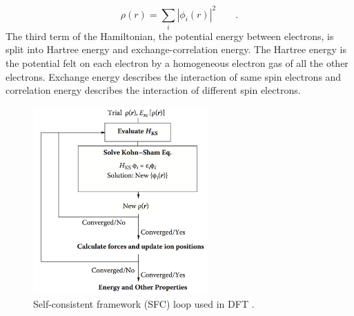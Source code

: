 \documentclass[3p,review,12pt]{elsarticle}
\begin{document}
\begin{equation}
\rho (r) = \sum_{i}|\phi _{i}(r)|^{2} \qquad.
\end{equation}
The third term of the Hamiltonian, the potential energy between electrons, is split into Hartree energy and exchange-correlation energy. The Hartree energy is  the potential felt on each electron by a homogeneous electron gas of all the other electrons. Exchange energy describes the interaction of same spin electrons and correlation energy describes the interaction of different spin electrons.
\begin{figure}[h]
	\includegraphics[width=0.6\textwidth]{scf}
	\centering
	\caption{Self-consistent framework (SFC) loop used in DFT \cite{Lee2012}.} 
\end{figure}
\end{document}

